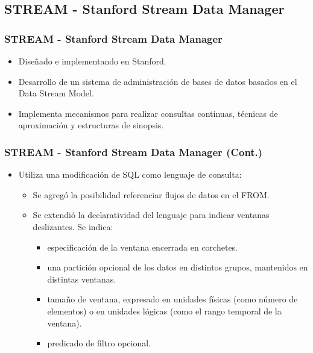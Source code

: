 \subsection{STREAM - Stanford Stream Data Manager}

\begin{frame}
\frametitle{STREAM - Stanford Stream Data Manager}
\begin{itemize}
\item Diseñado e implementando en Stanford.
\item Desarrollo de un sistema de administración de bases de datos basados en el Data Stream Model.
\item Implementa mecanismos para realizar consultas continuas, técnicas de aproximación y estructuras de sinopsis.
\end{itemize}
\end{frame}

\begin{frame}
\frametitle{STREAM - Stanford Stream Data Manager (Cont.)}
\begin{itemize}
\item Utiliza una modificación de SQL como lenguaje de consulta:
\begin{itemize}
\item Se agregó la posibilidad referenciar flujos de datos en el FROM.
\item Se extendió la declaratividad del lenguaje para indicar ventanas deslizantes. Se indica:
\begin{itemize}
\item especificación de la ventana encerrada en corchetes.
\item una partición opcional de los datos en distintos grupos, mantenidos en distintas ventanas.
\item tamaño de ventana, expresado en unidades físicas (como número de elementos) o en unidades lógicas (como el rango temporal de la ventana).
\item predicado de filtro opcional.
\end{itemize}
\end{itemize} 
\end{itemize}
\end{frame}

